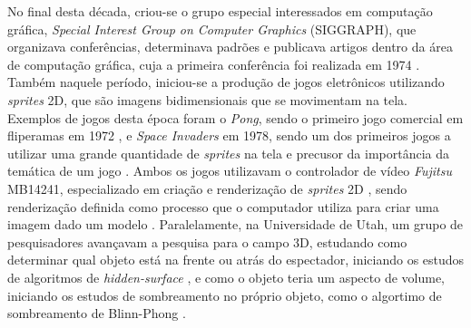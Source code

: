 No final desta década, criou-se o grupo especial interessados em computação gráfica, \emph{Special Interest Group on Computer Graphics} (SIGGRAPH), que organizava conferências, determinava padrões e publicava artigos dentro da área de computação gráfica, cuja a primeira conferência foi realizada em 1974 \cite{siggraph}. Também naquele período, iniciou-se a produção de jogos eletrônicos utilizando \emph{sprites} 2D, que são imagens bidimensionais que se movimentam na tela\cite{sprite}. Exemplos de jogos desta época foram o \emph{Pong}, sendo o primeiro jogo comercial em fliperamas em 1972 \cite{pong}, e \emph{Space Invaders} em 1978, sendo um dos primeiros jogos a utilizar uma grande quantidade de \emph{sprites}  na tela e precusor da importância da temática de um jogo \cite{intrgames}. Ambos os jogos utilizavam o controlador de vídeo \emph{Fujitsu} MB14241, especializado em criação e renderização de \emph{sprites} 2D \cite{fujitsu}, sendo renderização definida como processo que o computador utiliza para criar uma imagem dado um modelo \cite{opengl8th}. 
Paralelamente, na Universidade de Utah, um grupo de pesquisadores avançavam a pesquisa para o campo 3D, estudando como determinar qual objeto está na frente ou atrás do espectador, iniciando os estudos de algoritmos de  \emph{hidden-surface} \cite{hidden}, e como o objeto teria um aspecto de volume, iniciando os estudos de sombreamento no próprio objeto,  como o algortimo de sombreamento de Blinn-Phong \cite{phong}.

